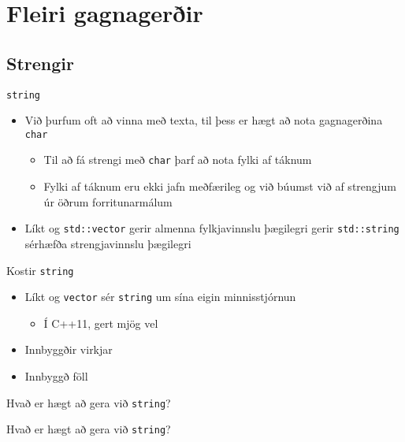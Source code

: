 \section{Fleiri gagnagerðir}

\subsection{Strengir}

\begin{frame}{\texttt{string}}
    \begin{itemize}
        \item Við þurfum oft að vinna með texta, til þess er hægt að nota gagnagerðina \texttt{char}
        \begin{itemize}
            \item Til að fá strengi með \texttt{char} þarf að nota fylki af táknum
            \item Fylki af táknum eru ekki jafn meðfærileg og við búumst við af strengjum úr öðrum forritunarmálum 
        \end{itemize}
        \item Líkt og \texttt{std::vector} gerir almenna fylkjavinnslu þægilegri gerir \texttt{std::string} sérhæfða strengjavinnslu þægilegri
    \end{itemize}
\end{frame}

\begin{frame}{Kostir \texttt{string}}
\begin{itemize}
    \item Líkt og \texttt{vector} sér \texttt{string} um sína eigin minnisstjórnun
    \begin{itemize}
    \item Í C++11, gert mjög vel
    \end{itemize}
    \item Innbyggðir virkjar
    \item Innbyggð föll
\end{itemize}
\end{frame}

\begin{frame}{Hvað er hægt að gera við \texttt{string}?}
\end{frame}

\begin{frame}{Hvað er hægt að gera við \texttt{string}?}
\end{frame}


